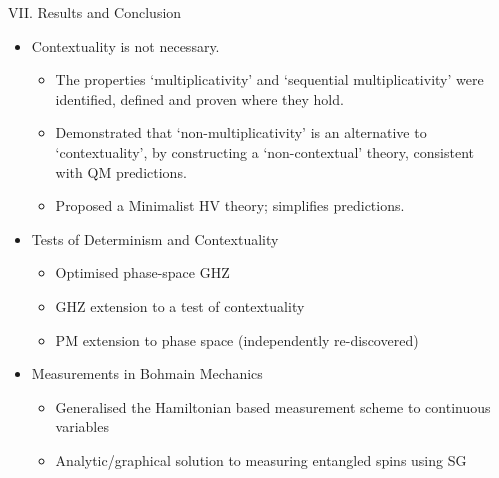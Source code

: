 \documentclass[final,hyperref={pdfpagelabels=false}]{beamer}
\begin{document}
\begin{frame}[t]
\begin{columns}[c]
\begin{column}{.69\textwidth}
\begin{columns}[b]
\begin{column}{.48\textwidth}

        \end{column}

        \begin{column}{.47\textwidth}



          \begin{block}{VII. Results and Conclusion}
            \begin{itemize}
            \item Contextuality is not necessary.
              {\tiny
              \begin{itemize}
              \item The properties `multiplicativity' and `sequential multiplicativity' were identified, defined and proven where they hold.
              \item Demonstrated that `non-multiplicativity' is an alternative to `contextuality', by constructing a `non-contextual' theory, consistent with QM predictions.
              \item Proposed a Minimalist HV theory; simplifies predictions.
              \end{itemize}}
            \item Tests of Determinism and Contextuality
              {\tiny
              \begin{itemize}
                \item Optimised phase-space GHZ
                \item GHZ extension to a test of contextuality
                \item PM extension to phase space (independently re-discovered)
              \end{itemize}}
            \item Measurements in Bohmain Mechanics
              {\tiny
              \begin{itemize}
                \item Generalised the Hamiltonian based measurement scheme to continuous variables
                \item Analytic/graphical solution to measuring entangled spins using SG

\end{itemize}}
\end{itemize}
\end{block}
\end{column}
\end{columns}
\end{column}
\end{columns}
\end{frame}
\end{document}
